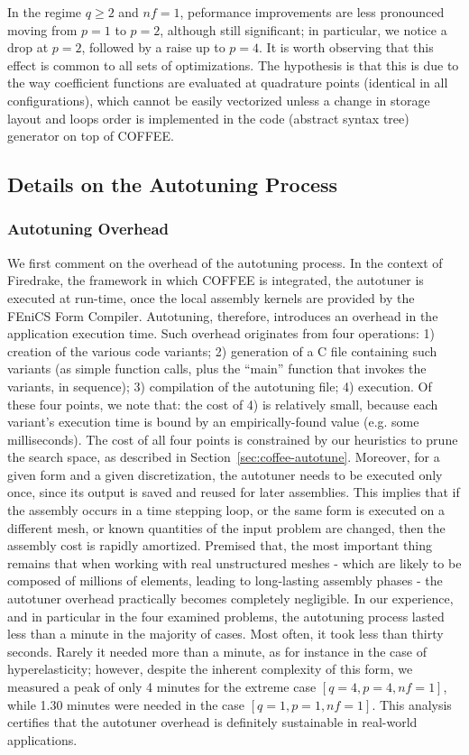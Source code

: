 In the regime $q \geq 2$ and $nf=1$, peformance improvements are less pronounced moving from $p=1$ to $p=2$, although still significant; in particular, we notice a drop at $p=2$, followed by a raise up to $p=4$. It is worth observing that this effect is common to all sets of optimizations. The hypothesis is that this is due to the way coefficient functions are evaluated at quadrature points (identical in all configurations), which cannot be easily vectorized unless a change in storage layout and loops order is implemented in the code (abstract syntax tree) generator on top of COFFEE. 

\subsection{Details on the Autotuning Process}
\label{sec:coffee-pereval-autotune}

\subsubsection{Autotuning Overhead}
We first comment on the overhead of the autotuning process. In the context of Firedrake, the framework in which COFFEE is integrated, the autotuner is executed at run-time, once the local assembly kernels are provided by the FEniCS Form Compiler. Autotuning, therefore, introduces an overhead in the application execution time. Such overhead originates from four operations: 1) creation of the various code variants; 2) generation of a C file containing such variants (as simple function calls, plus the ``main'' function that invokes the variants, in sequence); 3) compilation of the autotuning file; 4) execution. Of these four points, we note that: the cost of 4) is relatively small, because each variant's execution time is bound by an empirically-found value (e.g. some milliseconds). The cost of all four points is constrained by our heuristics to prune the search space, as described in Section~\ref{sec:coffee-autotune}. Moreover, for a given form and a given discretization, the autotuner needs to be executed only once, since its output is saved and reused for later assemblies. This implies that if the assembly occurs in a time stepping loop, or the same form is executed on a different mesh, or known quantities of the input problem are changed, then the assembly cost is rapidly amortized. Premised that, the most important thing remains that when working with real unstructured meshes - which are likely to be composed of millions of elements, leading to long-lasting assembly phases - the autotuner overhead practically becomes completely negligible. In our experience, and in particular in the four examined problems, the autotuning process lasted less than a minute in the majority of cases. Most often, it took less than thirty seconds. Rarely it needed more than a minute, as for instance in the case of hyperelasticity; however, despite the inherent complexity of this form, we measured a peak of only 4 minutes for the extreme case $[q=4, p=4, nf=1]$, while 1.30 minutes were needed in the case $[q=1, p=1, nf=1]$. This analysis certifies that the autotuner overhead is definitely sustainable in real-world applications.

